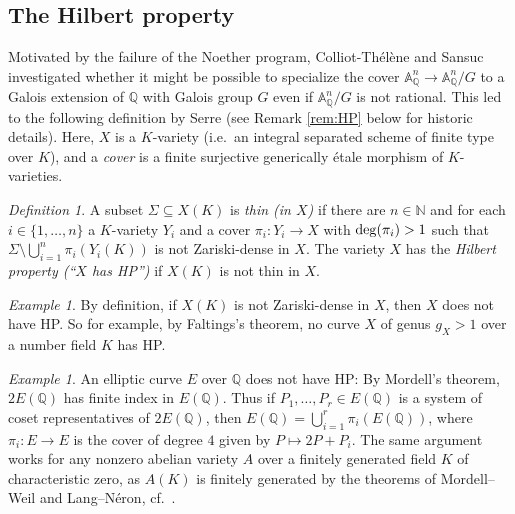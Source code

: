 \documentclass[10pt,a4paper]{amsart}
\theoremstyle{plain}
\theoremstyle{remark}
\newtheorem{definition}[theorem]{Definition}
\newtheorem{example}[theorem]{Example}
\numberwithin{theorem}{section}
\begin{document}
\subsection{The Hilbert property}
\label{sec:HP}

Motivated by the failure of the Noether program,
Colliot-Th\'el\`ene and Sansuc \cite{CTS}
investigated whether it might be possible to specialize
the cover $\mathbb{A}_\mathbb{Q}^n\rightarrow\mathbb{A}_\mathbb{Q}^n/G$ to a 
Galois extension of $\mathbb{Q}$ with Galois group $G$
even if $\mathbb{A}^n_\mathbb{Q}/G$ is not rational.
This led to the following definition by Serre \cite{Serre} (see Remark \ref{rem:HP} below for historic details).
Here, $X$ is a $K$-variety (i.e.~an integral separated scheme of finite type over $K$),
and a {\em cover} is a finite surjective generically \'etale morphism of $K$-varieties.

 

\begin{definition}\label{def:thin}\label{def:HP}
A subset $\Sigma\subseteq X(K)$ is \emph{thin (in $X$)} if there are $n\in\mathbb{N}$
and for each $i\in\{1,\dots,n\}$ a $K$-variety $Y_i$ and a cover $\pi_i\colon Y_i\to X$
with ${\rm deg}(\pi_i)>1$ such that
$\Sigma \setminus \bigcup_{i=1}^n \pi_i(Y_i(K))$
is not Zariski-dense in $X$. 
The variety $X$ has the {\em Hilbert property (``$X$ has HP'')} if $X(K)$ is not thin in $X$.
\end{definition}

\begin{example}
By definition, if $X(K)$ is not Zariski-dense in $X$, then $X$ does not have HP.
So for example, by Faltings's theorem, no curve $X$ of genus $g_X>1$ over a number field $K$ has HP.
\end{example}

\begin{example}\label{ex:abelian_var_not_HP}
An elliptic curve $E$ over $\mathbb{Q}$ does not have HP:
By Mordell's theorem, $2E(\mathbb{Q})$ has finite index in $E(\mathbb{Q})$.
Thus if $P_1,\dots,P_r \in E(\mathbb{Q})$ is a system of coset representatives of $2E(\mathbb{Q})$, then $E(\mathbb{Q})=\bigcup_{i=1}^r\pi_i(E(\mathbb{Q}))$,
where $\pi_i\colon E\rightarrow E$ is the cover of degree $4$ given by
$P\mapsto 2P+P_i$.
The same argument works for any nonzero abelian variety $A$
over a finitely generated field $K$ of characteristic zero,
as $A(K)$ is finitely generated by the theorems of Mordell--Weil and Lang--N\'eron, cf.~\cite[Exercise 4 on p.~20]{Serre}.
\end{example}
 
\end{document}

